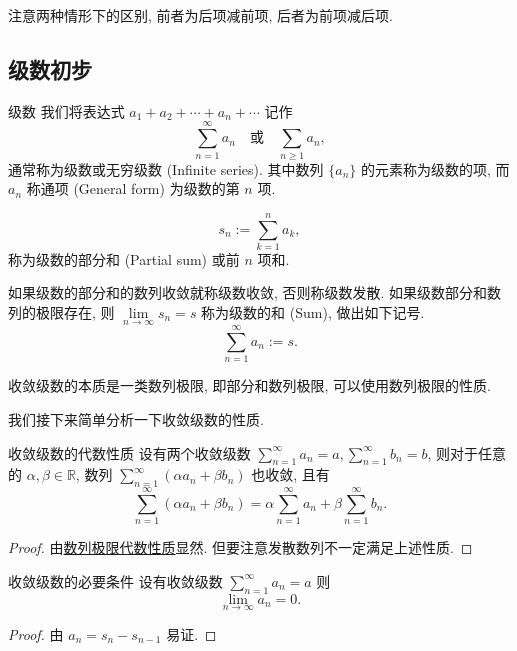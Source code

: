 \documentclass[cn,toc=twocol]{elegantbook}
\newcommand{\R}{\mathbb{R}}
\begin{document}
\begin{remark}
注意两种情形下的区别, 前者为后项减前项, 后者为前项减后项.	
\end{remark}



\subsection{级数初步}
\begin{definition}{级数}
我们将表达式 $a_1 + a_2 + \cdots + a_n + \cdots$ 记作 
\[
	\sum\limits_{n=1}^\infty a_n \quad\text{或}\quad \sum\limits_{n \ge 1} a_n ,
\]
通常称为级数或无穷级数 (Infinite series). 其中数列 $\{a_n\}$ 的元素称为级数的项, 而 $a_n$ 称通项 (General form) 为级数的第 $n$ 项. 

\[
	s_n := \sum\limits_{k=1}^n a_k,
\] 
称为级数的部分和 (Partial sum) 或前 $n$ 项和.

如果级数的部分和的数列收敛就称级数收敛, 否则称级数发散. 如果级数部分和数列的极限存在, 则 $\lim\limits_{n\to\infty} s_n = s$ 称为级数的和 (Sum), 做出如下记号.
\[
	\sum_{n=1}^\infty a_n := s.
\]
\end{definition}

\begin{remark}
	收敛级数的本质是一类数列极限, 即部分和数列极限, 可以使用数列极限的性质.
\end{remark}

我们接下来简单分析一下收敛级数的性质.
\begin{theorem}{收敛级数的代数性质}
	设有两个收敛级数 $\sum\limits_{n = 1}^\infty a_n = a, \sum\limits_{n = 1}^\infty b_n = b$, 则对于任意的 $\alpha , \beta \in \R$, 数列 $\sum\limits_{n = 1}^\infty (\alpha a_n + \beta b_n)$ 也收敛, 且有
	\[
		\sum\limits_{n = 1}^\infty (\alpha a_n + \beta b_n) = \alpha\sum\limits_{n = 1}^\infty a_n + \beta\sum\limits_{n = 1}^\infty b_n.
	\]
\end{theorem}

\begin{proof}
	由\hyperref[thm:Slimit_p5]{数列极限代数性质}显然. 但要注意发散数列不一定满足上述性质.
\end{proof}

\begin{theorem}{收敛级数的必要条件}
	设有收敛级数 $\sum\limits_{n = 1}^\infty a_n = a$ 则
	\[
		\lim_{n \to \infty} a_n = 0.
	\]
\end{theorem}

\begin{proof}
	由 $a_n = s_n - s_{n-1}$ 易证.
\end{proof}
\end{document}
